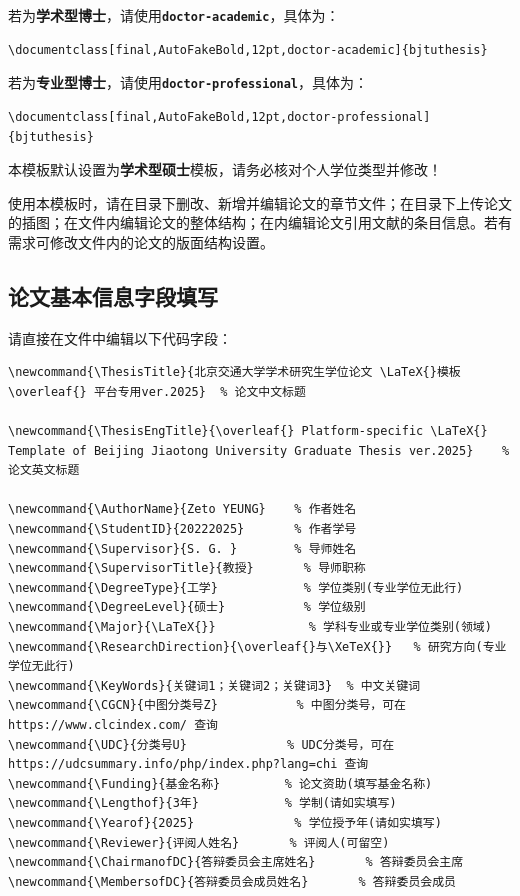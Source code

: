 若为\textbf{学术型博士}，请使用\texttt{\textbf{doctor-academic}}，具体为：
\begin{lstlisting}[language={[LaTeX]TeX}]
    \documentclass[final,AutoFakeBold,12pt,doctor-academic]{bjtuthesis}
\end{lstlisting}

若为\textbf{专业型博士}，请使用\texttt{\textbf{doctor-professional}}，具体为：
\begin{lstlisting}[language={[LaTeX]TeX}]
    \documentclass[final,AutoFakeBold,12pt,doctor-professional]{bjtuthesis}
\end{lstlisting}

本模板默认设置为\textbf{学术型硕士}模板，请务必核对个人学位类型并修改！

使用本模板时，请在目录下删改、新增并编辑论文的章节文件；在目录下上传论文的插图；在文件内编辑论文的整体结构；在内编辑论文引用文献的条目信息。若有需求可修改文件内的论文的版面结构设置。

\subsection{论文基本信息字段填写}\label{论文基本信息字段填写}
请直接在文件中编辑以下代码字段：

\begin{lstlisting}[language={[LaTeX]TeX}]
    % 定义论文信息字段
\newcommand{\ThesisTitle}{北京交通大学学术研究生学位论文 \LaTeX{}模板 \overleaf{} 平台专用ver.2025}  % 论文中文标题

\newcommand{\ThesisEngTitle}{\overleaf{} Platform-specific \LaTeX{} Template of Beijing Jiaotong University Graduate Thesis ver.2025}    % 论文英文标题

\newcommand{\AuthorName}{Zeto YEUNG}    % 作者姓名
\newcommand{\StudentID}{20222025}       % 作者学号
\newcommand{\Supervisor}{S. G. }        % 导师姓名
\newcommand{\SupervisorTitle}{教授}       % 导师职称
\newcommand{\DegreeType}{工学}            % 学位类别(专业学位无此行)
\newcommand{\DegreeLevel}{硕士}           % 学位级别
\newcommand{\Major}{\LaTeX{}}             % 学科专业或专业学位类别(领域)
\newcommand{\ResearchDirection}{\overleaf{}与\XeTeX{}}   % 研究方向(专业学位无此行)
\newcommand{\KeyWords}{关键词1；关键词2；关键词3}  % 中文关键词
\newcommand{\CGCN}{中图分类号Z}           % 中图分类号，可在https://www.clcindex.com/ 查询
\newcommand{\UDC}{分类号U}              % UDC分类号，可在https://udcsummary.info/php/index.php?lang=chi 查询
\newcommand{\Funding}{基金名称}         % 论文资助(填写基金名称)
\newcommand{\Lengthof}{3年}            % 学制(请如实填写)
\newcommand{\Yearof}{2025}              % 学位授予年(请如实填写)
\newcommand{\Reviewer}{评阅人姓名}       % 评阅人(可留空)
\newcommand{\ChairmanofDC}{答辩委员会主席姓名}       % 答辩委员会主席
\newcommand{\MembersofDC}{答辩委员会成员姓名}       % 答辩委员会成员
\end{lstlisting}

